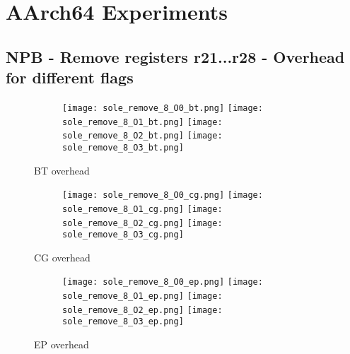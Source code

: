 \documentclass[11pt]{article}
\begin{document}
    \section*{AArch64 Experiments}

%
%

    \subsection*{NPB - Remove registers r21...r28 - Overhead for different flags}

    \begin{figure}[ht]
        \begin{subfigure}{\linewidth}
            \texttt{[image: sole\_remove\_8\_O0\_bt.png]}\hfill
            \texttt{[image: sole\_remove\_8\_O1\_bt.png]}\hfill
            \texttt{[image: sole\_remove\_8\_O2\_bt.png]}\hfill
            \texttt{[image: sole\_remove\_8\_O3\_bt.png]}\hfill
        \end{subfigure}\par\medskip
        \caption{BT overhead}
        \label{fig:sole_figs_1}
    \end{figure}

    \begin{figure}[ht]
        \begin{subfigure}{\linewidth}
            \texttt{[image: sole\_remove\_8\_O0\_cg.png]}\hfill
            \texttt{[image: sole\_remove\_8\_O1\_cg.png]}\hfill
            \texttt{[image: sole\_remove\_8\_O2\_cg.png]}\hfill
            \texttt{[image: sole\_remove\_8\_O3\_cg.png]}\hfill
        \end{subfigure}\par\medskip
        \caption{CG overhead}
        \label{fig:sole_figs_2}
    \end{figure}
\begin{figure}[ht]
        \begin{subfigure}{\linewidth}
            \texttt{[image: sole\_remove\_8\_O0\_ep.png]}\hfill
            \texttt{[image: sole\_remove\_8\_O1\_ep.png]}\hfill
            \texttt{[image: sole\_remove\_8\_O2\_ep.png]}\hfill
            \texttt{[image: sole\_remove\_8\_O3\_ep.png]}\hfill
        \end{subfigure}\par\medskip
        \caption{EP overhead}
        \label{fig:sole_figs_3}
    \end{figure}
\end{document}
